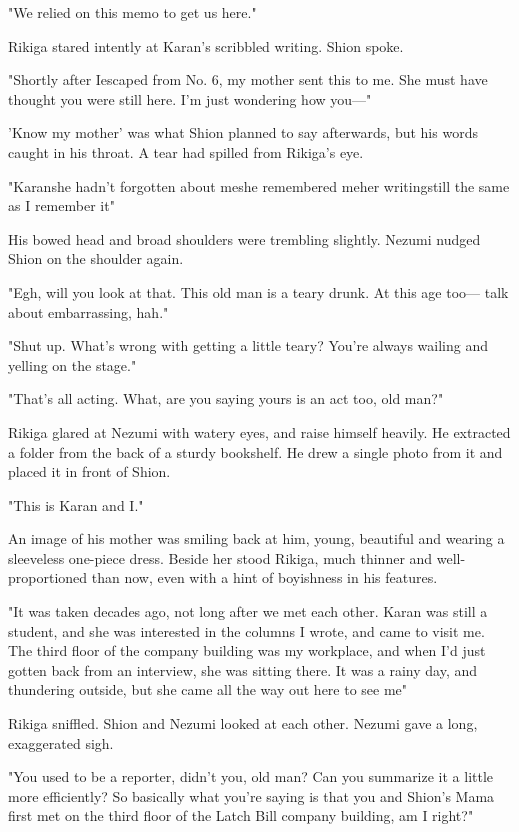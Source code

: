 "We relied on this memo to get us here."

Rikiga stared intently at Karan's scribbled writing. Shion spoke.

"Shortly after I\el escaped from No. 6, my mother sent this to me. She
must have thought you were still here. I'm just wondering how you---"

'Know my mother' was what Shion planned to say afterwards, but his words
caught in his throat. A tear had spilled from Rikiga's eye.

"Karan\el she hadn't forgotten about me\el she remembered me\el her
writing\el still the same as I remember it\el "

His bowed head and broad shoulders were trembling slightly. Nezumi
nudged Shion on the shoulder again.

"Egh, will you look at that. This old man is a teary drunk. At this age
too--- talk about embarrassing, hah."

"Shut up. What's wrong with getting a little teary? You're always
wailing and yelling on the stage."

"That's all acting. What, are you saying yours is an act too, old man?"

Rikiga glared at Nezumi with watery eyes, and raise himself heavily. He
extracted a folder from the back of a sturdy bookshelf. He drew a single
photo from it and placed it in front of Shion.

"This is Karan and I."

An image of his mother was smiling back at him, young, beautiful and
wearing a sleeveless one-piece dress. Beside her stood Rikiga, much
thinner and well-proportioned than now, even with a hint of boyishness
in his features.

"It was taken decades ago, not long after we met each other. Karan was
still a student, and she was interested in the columns I wrote, and came
to visit me. The third floor of the company building was my workplace,
and when I'd just gotten back from an interview, she was sitting there.
It was a rainy day, and thundering outside, but she came all the way out
here to see me\el "

Rikiga sniffled. Shion and Nezumi looked at each other. Nezumi gave a
long, exaggerated sigh.

"You used to be a reporter, didn't you, old man? Can you summarize it a
little more efficiently? So basically what you're saying is that you and
Shion's Mama first met on the third floor of the Latch Bill company
building, am I right?"


